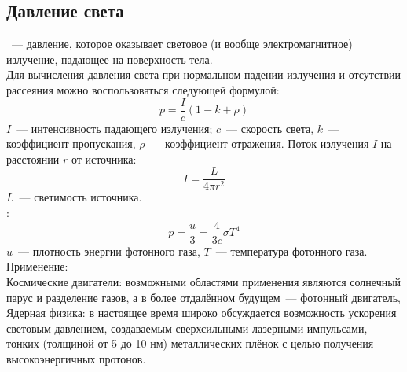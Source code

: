 \subsection{Давление света}
~--- давление, которое оказывает световое (и вообще электромагнитное) излучение, падающее на поверхность тела.\\
Для вычисления давления света при нормальном падении излучения и отсутствии рассеяния можно воспользоваться следующей формулой:
\begin{equation}
p = \frac{I}{c}(1-k+\rho)
\end{equation}
$I$~--- интенсивность падающего излучения; $c$~--- скорость света, $k$~--- коэффициент пропускания, $\rho$~--- коэффициент отражения.
Поток излучения $I$ на расстоянии $r$ от источника:
\begin{equation}
I=\frac{L}{4\pi r^2}
\end{equation}
$L$~--- светимость источника.\\
:
\begin{equation}
p = \frac{u}{3} = \frac{4}{3c}\sigma T^4
\end{equation}
$u$~--- плотность энергии фотонного газа, $T$~--- температура фотонного газа.
Применение:\\
Космические двигатели: возможными областями применения являются солнечный парус и разделение газов, а в более отдалённом будущем~--- фотонный двигатель,\\
Ядерная физика: в настоящее время широко обсуждается возможность ускорения световым давлением, создаваемым сверхсильными лазерными импульсами, тонких (толщиной от 5 до 10 нм) металлических плёнок с целью получения высокоэнергичных протонов.
